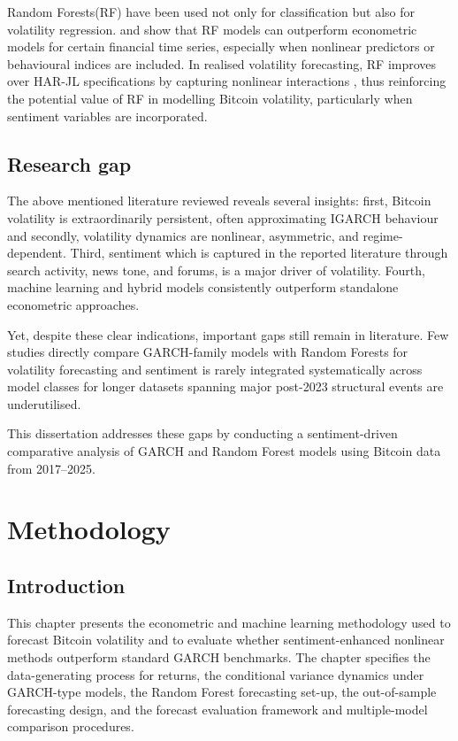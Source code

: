 \documentclass[12pt]{report}
\begin{document}
Random Forests(RF) have been used not only for classification but also for volatility regression. \cite{amoanu2025arimacomparison} and \cite{demirer2022riskaversion} show that RF models can outperform econometric models for certain financial time series, especially when 
nonlinear predictors or behavioural indices are included. In realised volatility forecasting, RF improves over HAR-JL specifications by capturing nonlinear interactions \citep{luong2018harjl}, thus reinforcing the potential value of RF in modelling Bitcoin volatility, particularly when sentiment variables are incorporated.


\section{Research gap}

The above mentioned literature reviewed reveals several insights:
first, Bitcoin volatility is extraordinarily persistent, often approximating IGARCH behaviour and secondly, volatility dynamics are nonlinear, asymmetric, and regime-dependent. Third, sentiment which is captured in the reported literature through search activity, news tone, and forums, is a major driver of volatility. Fourth, machine learning and hybrid models consistently outperform standalone econometric approaches.

Yet, despite these clear indications, important gaps still remain in literature. Few studies directly compare GARCH-family models with Random Forests for volatility forecasting and sentiment is rarely integrated systematically across model classes for longer datasets spanning major post-2023 structural events are underutilised.

This dissertation addresses these gaps by conducting a sentiment-driven comparative analysis of GARCH and Random Forest models using Bitcoin data from 2017–2025.


\newpage
\chapter{Methodology}

\section{Introduction}

This chapter presents the econometric and machine learning methodology used to forecast Bitcoin volatility and to evaluate whether sentiment-enhanced nonlinear methods outperform standard GARCH benchmarks. The chapter specifies the data-generating process for returns, the conditional variance dynamics under GARCH-type models, the Random Forest forecasting set-up, the out-of-sample forecasting design, and the forecast evaluation framework and multiple-model comparison procedures.
\end{document}
